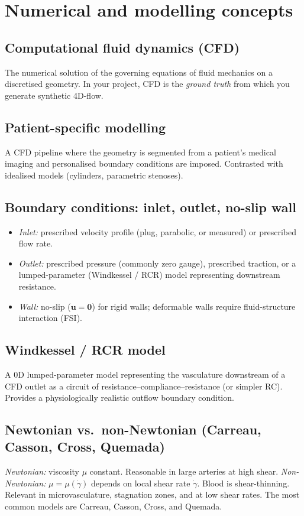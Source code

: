 \documentclass[11pt]{article}
\begin{document}
\section{Numerical and modelling concepts}

\subsection*{Computational fluid dynamics (CFD)}
The numerical solution of the governing equations of fluid mechanics on a discretised geometry. In your project, CFD is the \emph{ground truth} from which you generate synthetic 4D-flow.

\subsection*{Patient-specific modelling}
A CFD pipeline where the geometry is segmented from a patient's medical imaging and personalised boundary conditions are imposed. Contrasted with idealised models (cylinders, parametric stenoses).

\subsection*{Boundary conditions: inlet, outlet, no-slip wall}
\begin{itemize}[noitemsep]
  \item \emph{Inlet:} prescribed velocity profile (plug, parabolic, or measured) or prescribed flow rate.
  \item \emph{Outlet:} prescribed pressure (commonly zero gauge), prescribed traction, or a lumped-parameter (Windkessel / RCR) model representing downstream resistance.
  \item \emph{Wall:} no-slip ($\mathbf{u} = \mathbf{0}$) for rigid walls; deformable walls require fluid-structure interaction (FSI).
\end{itemize}

\subsection*{Windkessel / RCR model}
A 0D lumped-parameter model representing the vasculature downstream of a CFD outlet as a circuit of resistance--compliance--resistance (or simpler RC). Provides a physiologically realistic outflow boundary condition.

\subsection*{Newtonian vs.\ non-Newtonian (Carreau, Casson, Cross, Quemada)}
\emph{Newtonian:} viscosity $\mu$ constant. Reasonable in large arteries at high shear. \emph{Non-Newtonian:} $\mu = \mu(\dot\gamma)$ depends on local shear rate $\dot\gamma$. Blood is shear-thinning. Relevant in microvasculature, stagnation zones, and at low shear rates. The most common models are Carreau, Casson, Cross, and Quemada.
\end{document}
